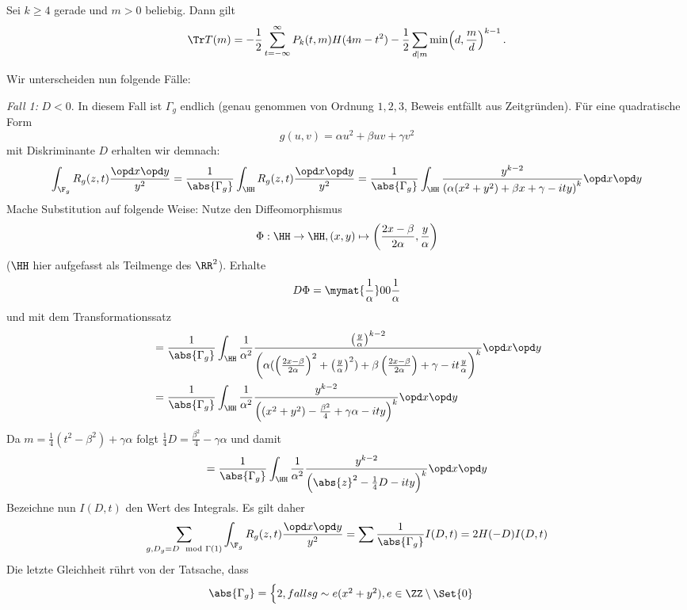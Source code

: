 \begin{theorem}
	Sei $k \geq 4$ gerade und $m > 0$ beliebig. Dann gilt
	\[
		\Tr T(m) = -\frac{1}{2} \sum_{t=-\infty}^\infty P_k(t,m) H(4m-t^2) - \frac{1}{2} \sum_{d|m} \min\Bigl(d, \frac{m}{d}\Bigr)^{k-1}\,.
	\]
\end{theorem}

\begin{bewe}
Wir unterscheiden nun folgende Fälle:

\emph{Fall 1:} $D < 0$. In diesem Fall ist $\Gamma_g$ endlich (genau genommen von Ordnung $1, 2, 3$, Beweis entfällt aus Zeitgründen). Für eine quadratische Form
\[
	g(u,v) = \alpha u^2 + \beta uv + \gamma v^2
\]
mit Diskriminante $D$ erhalten wir demnach:
\[
	\int_{\F_g} R_g (z,t) \frac{\opd x \opd y}{y^2} = \frac {1}{\abs{\Gamma_g}} \int_\HH R_g (z,t) \frac{\opd x \opd y}{y^2} = \frac {1}{\abs{\Gamma_g}} \int_\HH \frac{y^{k-2}}{\left( \alpha(x^2 + y^2) + \beta x + \gamma - ity \right)^k} \opd x \opd y
\]
Mache Substitution auf folgende Weise: Nutze den Diffeomorphismus
\[
	\Phi: \HH \to \HH, (x, y) \mapsto \left( \frac {2x-\beta}{2\alpha}, \frac y\alpha \right)
\]
($\HH$ hier aufgefasst als Teilmenge des $\RR^2$). Erhalte
\[
	D\Phi = \mymat {\frac 1\alpha}00{\frac 1\alpha}
\]
und mit dem Transformationssatz
\begin{align*}
	&= \frac {1}{\abs{\Gamma_g}} \int_\HH \frac {1}{\alpha^2} \frac{\left(\frac {y}{\alpha} \right)^{k-2}}{\left( \alpha(\left( \frac {2x-\beta}{2\alpha} \right)^2 + \left( \frac y\alpha \right)^2) + \beta \left( \frac {2x-\beta}{2\alpha} \right) + \gamma - it \frac y\alpha \right)^k} \opd x \opd y \\
	&= \frac {1}{\abs{\Gamma_g}} \int_\HH \frac {1}{\alpha^2} \frac{y^{k-2}}{\left( (x^2 + y^2) - \frac {\beta^2}4 + \gamma \alpha - ity \right)^k} \opd x \opd y
\end{align*}
Da $m = \frac 14 (t^2 - \beta^2) + \gamma\alpha$ folgt $\frac 14 D = \frac {\beta^2}4 - \gamma \alpha$ und damit
\[
	= \frac {1}{\abs{\Gamma_g}} \int_\HH \frac {1}{\alpha^2} \frac{y^{k-2}}{\left( \abs{z}^2 - \frac 14 D - ity \right)^k} \opd x \opd y
\]
Bezeichne nun $I(D, t)$ den Wert des Integrals. Es gilt daher
\[
	\sum_{g, D_g = D \mod \Gamma(1)} \int_{\F_g} R_g(z,t) \frac{\opd x \opd y}{y^2} = \sum \frac{1}{\abs{\Gamma_g}} I(D,t) = 2 H(-D) I(D,t)
\]
Die letzte Gleichheit rührt von der Tatsache, dass
\[
	\abs{\Gamma_g} = \begin{cases}
	2, falls g \sim e(x^2 + y^2), e \in \ZZ \setminus \Set {0} \\

\end{cases}\]
\end{bewe}

